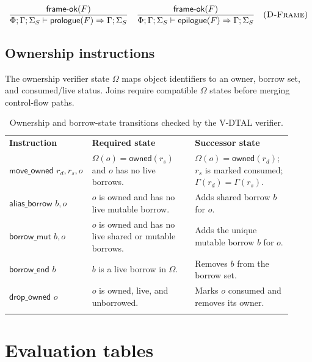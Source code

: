 \[
  \frac{\textsf{frame-ok}(F)}
       {\Phi; \Gamma; \Sigma_S \vdash \textsf{prologue}(F) \Rightarrow \Gamma; \Sigma_S}
  \quad
  \frac{\textsf{frame-ok}(F)}
       {\Phi; \Gamma; \Sigma_S \vdash \textsf{epilogue}(F) \Rightarrow \Gamma; \Sigma_S}
  \quad (\textsc{D-Frame})
\]

\section*{Ownership instructions}

The ownership verifier state $\Omega$ maps object identifiers to an owner, borrow set, and consumed/live status. Joins require compatible $\Omega$ states before merging control-flow paths.

\begin{table}[H]
  \centering
  \scriptsize
  \begin{tabularx}{\linewidth}{p{0.22\linewidth} p{0.36\linewidth} p{0.34\linewidth}}
    \tablehline
    \textbf{Instruction} & \textbf{Required state} & \textbf{Successor state} \\
    \tablehline
    $\textsf{move\_owned } r_d, r_s, o$
    & $\Omega(o)=\textsf{owned}(r_s)$ and $o$ has no live borrows.
    & $\Omega(o)=\textsf{owned}(r_d)$; $r_s$ is marked consumed; $\Gamma(r_d)=\Gamma(r_s)$. \\
    \tablehline
    $\textsf{alias\_borrow } b, o$
    & $o$ is owned and has no live mutable borrow.
    & Adds shared borrow $b$ for $o$. \\
    \tablehline
    $\textsf{borrow\_mut } b, o$
    & $o$ is owned and has no live shared or mutable borrows.
    & Adds the unique mutable borrow $b$ for $o$. \\
    \tablehline
    $\textsf{borrow\_end } b$
    & $b$ is a live borrow in $\Omega$.
    & Removes $b$ from the borrow set. \\
    \tablehline
    $\textsf{drop\_owned } o$
    & $o$ is owned, live, and unborrowed.
    & Marks $o$ consumed and removes its owner. \\
    \tablehline
  \end{tabularx}
  \caption{Ownership and borrow-state transitions checked by the V-DTAL verifier.}
  \label{tab:dtal-ownership-rules}
\end{table}

\chapter{Evaluation tables}\label{app:evaluation-supplementary}

